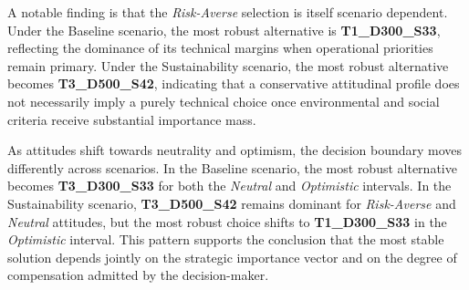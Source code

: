 \begin{table}[htbp]
\centering
\caption{Most robust alternatives and stability radii ($\rho$) across scenarios and attitudinal profiles. The \textit{Second most stable} column indicates the alternative with the second-largest stability radius, highlighting close competitors.}
\label{tab:combined_stability}
\end{table}

A notable finding is that the \textit{Risk-Averse} selection is itself scenario dependent. Under the Baseline scenario, the most robust alternative is \textbf{T1\_D300\_S33}, reflecting the dominance of its technical margins when operational priorities remain primary. Under the Sustainability scenario, the most robust alternative becomes \textbf{T3\_D500\_S42}, indicating that a conservative attitudinal profile does not necessarily imply a purely technical choice once environmental and social criteria receive substantial importance mass.

As attitudes shift towards neutrality and optimism, the decision boundary moves differently across scenarios. In the Baseline scenario, the most robust alternative becomes \textbf{T3\_D300\_S33} for both the \textit{Neutral} and \textit{Optimistic} intervals. In the Sustainability scenario, \textbf{T3\_D500\_S42} remains dominant for \textit{Risk-Averse} and \textit{Neutral} attitudes, but the most robust choice shifts to \textbf{T1\_D300\_S33} in the \textit{Optimistic} interval. This pattern supports the conclusion that the most stable solution depends jointly on the strategic importance vector and on the degree of compensation admitted by the decision-maker.

